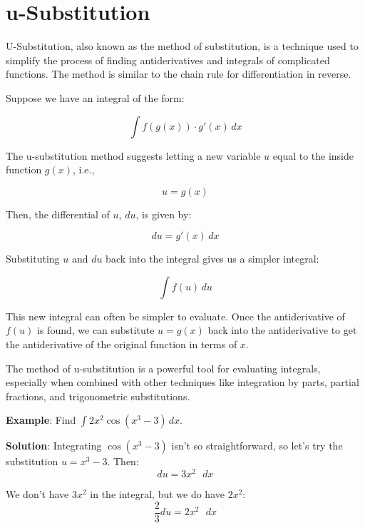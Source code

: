 \chapter{u-Substitution}


U-Substitution, also known as the method of substitution, is a technique used 
to simplify the process of finding antiderivatives and integrals of 
complicated functions. The method is similar to the chain rule for 
differentiation in reverse.

Suppose we have an integral of the form:

\begin{equation}
\int f(g(x)) \cdot g'(x) \, dx
\end{equation}

The u-substitution method suggests letting a new variable $u$ equal to the 
inside function $g(x)$, i.e., 

\begin{equation}
u = g(x)
\end{equation}

Then, the differential of $u$, $du$, is given by:

\begin{equation}
du = g'(x) \, dx
\end{equation}

Substituting $u$ and $du$ back into the integral gives us a simpler integral:

\begin{equation}
\int f(u) \, du
\end{equation}

This new integral can often be simpler to evaluate. Once the antiderivative of 
$f(u)$ is found, we can substitute $u=g(x)$ back into the antiderivative to 
get the antiderivative of the original function in terms of $x$.

The method of u-substitution is a powerful tool for evaluating integrals, 
especially when combined with other techniques like integration by parts, 
partial fractions, and trigonometric substitutions.

\textbf{Example}: Find $\int 2 x^2 \cos{ \left( x^3 - 3 \right)}\,dx$.

\textbf{Solution}: Integrating $\cos{ \left( x^3 - 3 \right)}$ isn't so 
straightforward, so let's try the substitution $u = x^3 - 3$. Then:
$$du = 3 x^2 \text{ }dx$$

We don't have $3 x^2$ in the integral, but we do have $2 x^2$:
$$\frac{2}{3} du = 2 x^2 \text{ } dx$$

